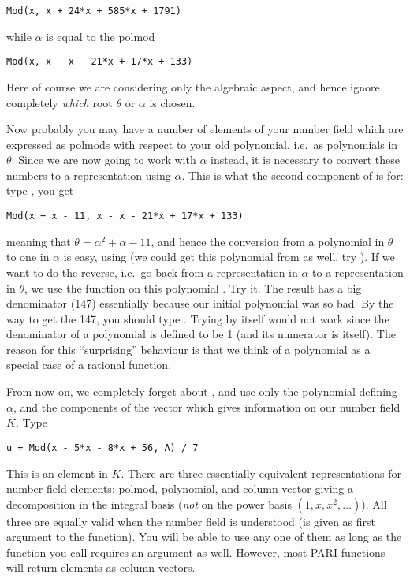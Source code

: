\centerline{\tt Mod(x, x + 24*x + 585*x + 1791)}

\noindent while $\alpha$ is equal to the polmod

\centerline{\tt Mod(x, x - x - 21*x + 17*x + 133)}

\noindent Here of course we are considering only the algebraic aspect, and
hence ignore completely {\it which} root $\theta$ or $\alpha$ is chosen.

Now probably you may have a number of elements of your number field which are
expressed as polmods with respect to your old polynomial, i.e.~as
polynomials in $\theta$. Since we are now going to work with $\alpha$
instead, it is necessary to convert these numbers to a representation using
$\alpha$. This is what the second component of  is for: type
, you get

\centerline{\tt Mod(x + x - 11, x - x - 21*x +
17*x + 133)}

\noindent meaning that $\theta = \alpha^2+\alpha-11$, and hence the conversion
from a polynomial in $\theta$ to one in $\alpha$ is easy, using 
(we could get this polynomial from  as well, try
). If we want to do the reverse, i.e.~go back from a
representation in $\alpha$ to a representation in $\theta$, we use the
function  on this polynomial . Try it. The result
has a big denominator (147) essentially because our initial polynomial
 was so bad. By the way to get the 147, you should type
. Trying  by itself would not
work since the denominator of a polynomial is defined to be 1 (and its
numerator is itself). The reason for this ``surprising'' behaviour is that we
think of a polynomial as a special case of a rational function. \smallskip

From now on, we completely forget about , and use only the polynomial
 defining $\alpha$, and the components of the vector  which
gives information on our number field $K$. Type

\centerline{\tt u = Mod(x - 5*x - 8*x + 56, A) / 7}

This is an element in $K$. There are three essentially equivalent
representations for number field elements: polmod, polynomial, and column
vector giving a decomposition in the integral basis  ({\it not} on
the power basis $(1,x,x^2,\dots)$). All three are equally valid when the
number field is understood (is given as first argument to the function).
You will be able to use any one of them as long as the function you call
requires an  argument as well. However, most PARI functions will
return elements as column vectors.


